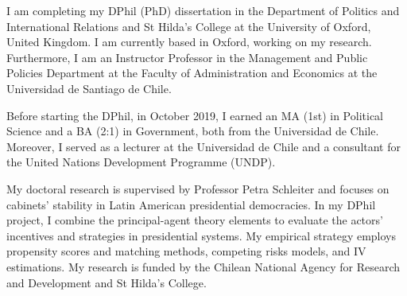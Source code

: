 




\vspace{3mm}

\begin{cvparagraph}

I am completing my DPhil (PhD) dissertation in the Department of Politics and International Relations and St Hilda’s College at the University of Oxford, United Kingdom. I am currently based in Oxford, working on my research. Furthermore, I am an Instructor Professor in the Management and Public Policies Department at the Faculty of Administration and Economics at the Universidad de Santiago de Chile.

Before starting the DPhil, in October 2019, I earned an MA (1st) in Political Science and a BA (2:1) in Government, both from the Universidad de Chile. Moreover, I served as a lecturer at the Universidad de Chile and a consultant for the United Nations Development Programme (UNDP).

My doctoral research is supervised by Professor Petra Schleiter and focuses on cabinets’ stability in Latin American presidential democracies. In my DPhil project, I combine the principal-agent theory elements to evaluate the actors’ incentives and strategies in presidential systems. My empirical strategy employs propensity scores and matching methods, competing risks models, and IV estimations. My research is funded by the Chilean National Agency for Research and Development and St Hilda's College.
\vspace{1mm}
\end{cvparagraph}
